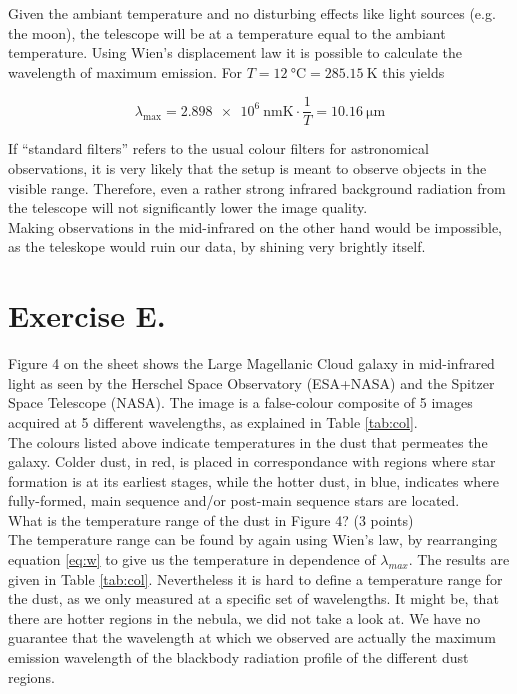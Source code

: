 \documentclass[11pt,a4paper,twoside]{article}
\begin{document}
Given the ambiant temperature and no disturbing effects like light sources
(e.g. the moon), the telescope will be at a temperature equal to the ambiant
temperature. Using Wien's displacement law it is possible to calculate the
wavelength of maximum emission. For $T = \SI{12}{\celsius} =
\SI{285.15}{\kelvin}$ this yields

\begin{equation}
 \lambda_{\text{max}} = \SI{2.898e6}{\nano\metre\kelvin} \cdot \frac{1}{T} = \SI{10.16}{\micro\metre}
\end{equation}

If ``standard filters'' refers to the usual colour filters for astronomical
observations, it is very likely that the setup is meant to observe objects in
the visible range. Therefore, even a rather strong infrared background radiation from
the telescope will not significantly lower the image quality. \\

Making observations in the mid-infrared on the other hand would be impossible,
as the teleskope would ruin our data, by shining very brightly itself.


\section*{Exercise E.}

Figure 4 on the sheet shows the Large Magellanic Cloud galaxy in mid-infrared
light as seen by the Herschel Space Observatory (ESA+NASA) and the Spitzer
Space Telescope (NASA). The image is a false-colour composite of \num{5} images
acquired at \num{5} different wavelengths, as explained in Table \ref{tab:col}. \\

The colours listed above indicate temperatures in the dust that permeates the
galaxy.  Colder dust, in red, is placed in correspondance with regions where
star formation is at its earliest stages, while the hotter dust, in blue,
indicates where fully-formed, main sequence and/or post-main sequence stars are
located.  \\
What is the temperature range of the dust in Figure 4? (3 points) \\

The temperature range can be found by again using Wien's law, by rearranging
equation \ref{eq:w} to give us the temperature in dependence of $\lambda_{max}$.
The results are given in Table \ref{tab:col}. 
Nevertheless it is hard to define a temperature range for the dust, as we only
measured at a specific set of wavelengths. It might be, that there are hotter
regions in the nebula, we did not take a look at. We have no guarantee that the wavelength at which we observed are actually the maximum emission wavelength of the blackbody radiation profile of the different dust regions. \\
\end{document}

